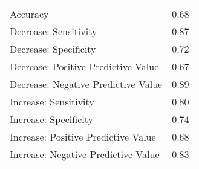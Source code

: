 \begin{table}[ht]
\centering
\begin{tabular}{lr}
  \hline
 &  \\ 
  \hline
Accuracy & 0.68 \\ 
  Decrease: Sensitivity & 0.87 \\ 
  Decrease: Specificity & 0.72 \\ 
  Decrease: Positive Predictive Value & 0.67 \\ 
  Decrease: Negative Predictive Value & 0.89 \\ 
  Increase: Sensitivity & 0.80 \\ 
  Increase: Specificity & 0.74 \\ 
  Increase: Positive Predictive Value & 0.68 \\ 
  Increase: Negative Predictive Value & 0.83 \\ 
   \hline
\end{tabular}
\end{table}
